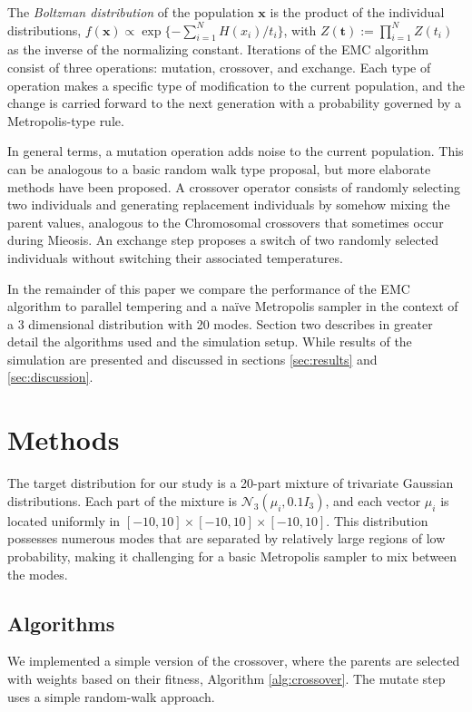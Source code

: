 \documentclass[12pt]{article}\usepackage[]{graphicx}\usepackage[]{color}
\newcommand{\grady}[1]{\marginpar{#1--Grady}}
\newcommand{\bx}{\mathbf x}
\newcommand{\bt}{\mathbf t}
\begin{document}
The \emph{Boltzman distribution} of the population $\bx$ is the
product of the individual distributions, $f(\bx) \propto \exp \{ -\sum_{i=1}^N
H(x_i)/ t_i \}$, with $Z(\bt) := \prod_{i=1}^N Z(t_i)$ as the inverse
of the normalizing constant.  Iterations of the EMC algorithm consist
of three operations: mutation, crossover, and exchange. Each type of
operation makes a specific type of modification to the current
population, and the change is carried forward to the next generation
with a probability governed by a Metropolis-type rule.

In general terms, a mutation operation adds noise to the current
population. This can be analogous to a basic random walk type
proposal, but more elaborate methods have been
proposed.\grady{citation} A crossover operator consists of
randomly selecting two individuals and generating replacement
individuals by somehow mixing the parent values, analogous to the
Chromosomal crossovers that sometimes occur during Mieosis.  An
exchange step proposes a switch of two randomly selected individuals
without switching their associated temperatures.


In the remainder of this paper we compare the performance of the EMC
algorithm to parallel tempering and a na\"ive Metropolis sampler in
the context of a 3 dimensional distribution with 20 modes.  Section
two describes in greater detail the algorithms used and the simulation
setup.  While results of the simulation are presented and discussed in
sections \ref{sec:results} and \ref{sec:discussion}.

\setcounter{section}{1}
\section{Methods}
\label{sec:methods}
The target distribution for our study is a 20-part mixture of
trivariate Gaussian distributions. Each part of the mixture is
$\mathcal{N}_3(\mu_i, 0.1I_3)$, and each vector $\mu_i$ is located
uniformly in $[-10,10]\times[-10,10]\times[-10,10].$ This distribution
possesses numerous modes that are separated by relatively large
regions of low probability, making it challenging for a basic
Metropolis sampler to mix between the modes.

\subsection{Algorithms}
\label{sec:algorithms}

We implemented a simple version of the crossover, where the parents
are selected with weights based on their fitness, Algorithm
\ref{alg:crossover}. The mutate step uses a simple random-walk
approach.
\end{document}
